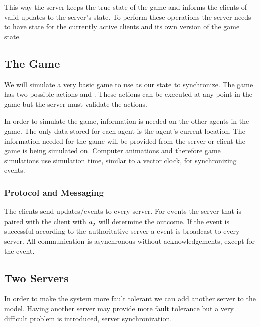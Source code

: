 	This way the server keeps the true state of the game and informs the clients of valid updates to the server's state. To perform these operations the server needs to have state for the currently active clients and its own version of the game state.

\subsection{The Game}

	We will simulate a very basic game to use as our state to synchronize. 
	The game has two possible actions \move{\agent}{\position} and . These actions can be executed at any point in the game but the server must validate the actions. 
	
	In order to simulate the game, information is needed on the other agents in the game. The only data stored for each agent is the agent's current location. The information needed for the game will be provided from the server or client the game is being simulated on. Computer animations and therefore game simulations use simulation time, similar to a vector clock, for synchronizing events.
	
\subsubsection{Protocol and Messaging}

	The clients send updates/events to every server. For  events the server that is paired with the client with $a_{j}$ will determine the outcome. If the  event is successful according to the authoritative server a  event is broadcast to every server. All communication is asynchronous without acknowledgements, except for the  event.

\subsection{Two Servers }

	In order to make the system more fault tolerant we can add another server to the \clientServer model. Having another server may provide more fault tolerance but a very difficult problem is introduced, server synchronization.
	
